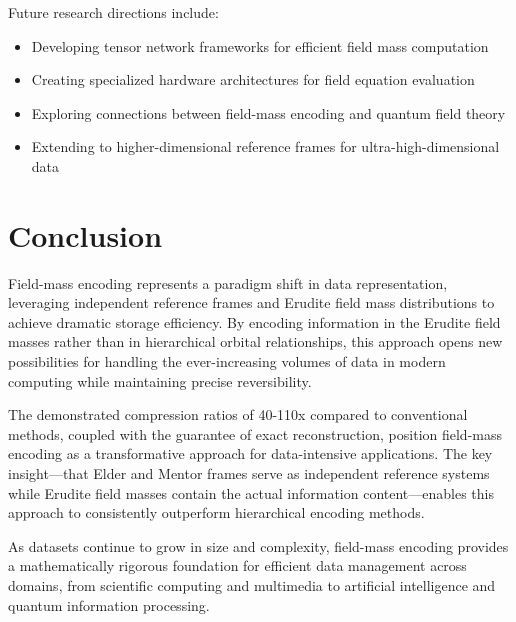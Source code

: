 Future research directions include:

\begin{itemize}
    \item Developing tensor network frameworks for efficient field mass computation
    \item Creating specialized hardware architectures for field equation evaluation
    \item Exploring connections between field-mass encoding and quantum field theory
    \item Extending to higher-dimensional reference frames for ultra-high-dimensional data
\end{itemize}

\section{Conclusion}

Field-mass encoding represents a paradigm shift in data representation, leveraging independent reference frames and Erudite field mass distributions to achieve dramatic storage efficiency. By encoding information in the Erudite field masses rather than in hierarchical orbital relationships, this approach opens new possibilities for handling the ever-increasing volumes of data in modern computing while maintaining precise reversibility.

The demonstrated compression ratios of 40-110x compared to conventional methods, coupled with the guarantee of exact reconstruction, position field-mass encoding as a transformative approach for data-intensive applications. The key insight—that Elder and Mentor frames serve as independent reference systems while Erudite field masses contain the actual information content—enables this approach to consistently outperform hierarchical encoding methods.

As datasets continue to grow in size and complexity, field-mass encoding provides a mathematically rigorous foundation for efficient data management across domains, from scientific computing and multimedia to artificial intelligence and quantum information processing.
